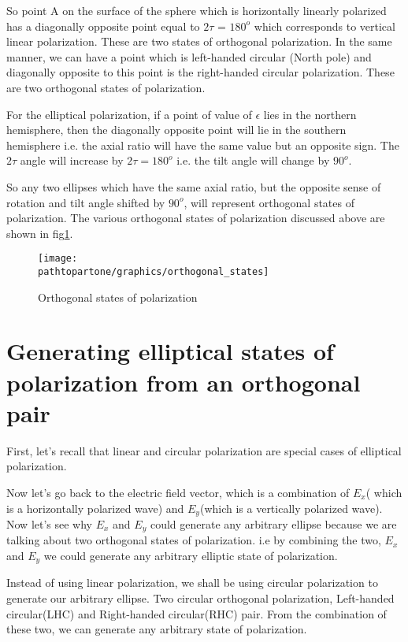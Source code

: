 So point A on the surface of the sphere which is horizontally linearly polarized has a diagonally opposite point equal to $2\tau$ = $180^{o}$ which corresponds to vertical linear polarization. These are two states of orthogonal polarization. In the same manner, we can have a point which is left-handed circular (North pole) and diagonally opposite to this point is the right-handed circular polarization. These are two orthogonal states of polarization.

For the elliptical polarization, if a point of value of $\epsilon$ lies in the northern hemisphere, then the diagonally opposite point will lie in the southern hemisphere i.e. the axial ratio will have the same value but an opposite sign. The $2\tau$ angle will increase by $2\tau = 180^{o}$ i.e. the tilt angle will change by $90^{o}$.

So any two ellipses which have the same axial ratio, but the opposite sense of rotation and tilt angle shifted by $90^{o}$, will represent orthogonal states of polarization. The various orthogonal states of polarization discussed above are shown in fig\ref{fig:orthogonal_states_of_polarization}.

\begin{figure}[h]
\centering
\texttt{[image: \\pathtopartone/graphics/orthogonal\_states]}
\caption{Orthogonal states of polarization}
\label{fig:orthogonal_states_of_polarization}
\end{figure}

\section{Generating elliptical states of polarization from an orthogonal pair}
First, let's recall that linear and circular polarization are special cases of elliptical polarization. 

Now let's go back to the electric field vector, which is a combination of $E_{x}$( which is a horizontally polarized wave) and $E_{y}$(which is a vertically polarized wave). Now let's see why $E_{x}$ and $E_{y}$ could generate any arbitrary ellipse because we are talking about two orthogonal states of polarization. i.e by combining the two, $E_{x}$ and $E_{y}$ we could generate any arbitrary elliptic state of polarization.

Instead of using linear polarization, we shall be using circular polarization to generate our arbitrary ellipse. Two circular orthogonal polarization, Left-handed circular(LHC) and Right-handed circular(RHC) pair. From the combination of these two, we can generate any arbitrary state of polarization. 

